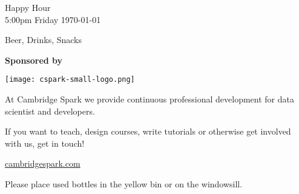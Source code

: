 \documentclass[a4paper,portrait]{article}
\begin{document}
\sf
\thispagestyle{empty}

\begin{center}

    {\Large Happy Hour} \\ \smallskip
    {\large 5:00pm Friday \today}

    \vfill

    {\huge Beer, Drinks, Snacks}\\ \bigskip \bigskip

    \vfill

    \textbf{\Large Sponsored by} \\ \bigskip

    \texttt{[image: cspark-small-logo.png]} \bigskip \bigskip

    \begin{minipage}{0.6\textwidth}{\large
At Cambridge Spark we provide continuous professional development for
data scientist and developers.

\bigskip

If you want to teach, design courses, write tutorials or otherwise get
involved with us, get in touch!

\bigskip \centering

}
    \end{minipage}

    \Large \url{cambridgespark.com}

    \vfill

\bigskip
Please place used bottles in the yellow bin or on the windowsill.

\end{center}

\medskip
\end{document}
